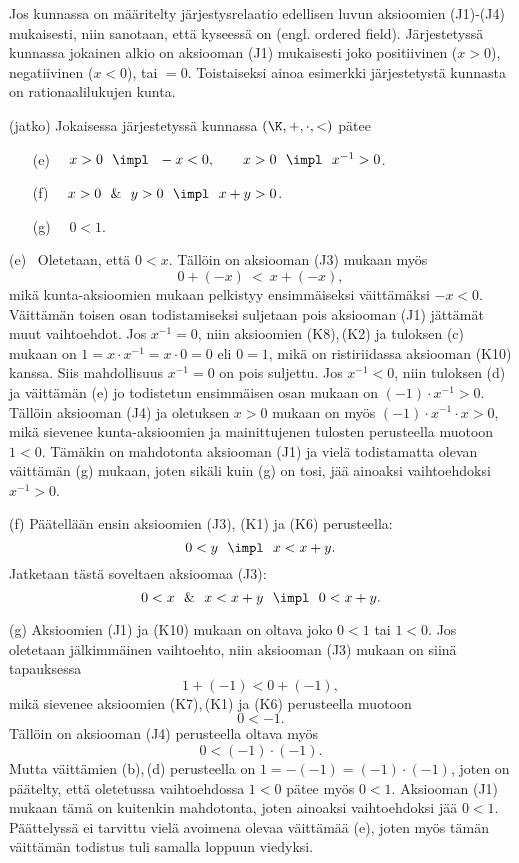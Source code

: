 Jos kunnassa on määritelty järjestysrelaatio edellisen luvun aksioomien (J1)-(J4) mukaisesti,
niin sanotaan, että kyseessä on  (engl. ordered field). Järjestetyssä
kunnassa jokainen alkio on aksiooman (J1) mukaisesti joko positiivinen ($x>0$), negatiivinen
($x<0$), tai $=0$. Toistaiseksi ainoa esimerkki järjestetystä kunnasta on rationaalilukujen
kunta. 
\addtocounter{Thm}{-2}
\begin{Lause} (jatko) Jokaisessa järjestetyssä kunnassa $(\K,+,\cdot,<)$ pätee
\begin{itemize}
\item[(e)] $\quad x>0\ \ \impl\ \ -x<0, \quad\quad x>0\ \ \impl\ \ x^{-1} > 0$.
\item[(f)] $\quad x>0\ \ \&\ \ y>0 \ \ \impl\ \ x+y>0$.
\item[(g)] $\quad 0 < 1$.
\end{itemize} \end{Lause}
\addtocounter{Thm}{1}
\tod (e) \ Oletetaan, että $0<x$. Tällöin on aksiooman (J3) mukaan myös 
\[
0+(-x)\ <\ x + (-x), 
\]
mikä kunta-aksioomien mukaan pelkistyy ensimmäiseksi väittämäksi $-x < 0$. Väittämän toisen 
osan todistamiseksi suljetaan pois aksiooman (J1) jättämät muut vaihtoehdot. Jos $x^{-1} = 0$,
niin aksioomien (K8),\,(K2) ja tuloksen (c) mukaan on $1 = x \cdot x^{-1} = x \cdot 0 = 0$ eli
$0=1$, mikä on ristiriidassa aksiooman (K10) kanssa. Siis mahdollisuus $x^{-1} = 0$ on pois
suljettu. Jos $x^{-1} < 0$, niin tuloksen (d) ja väittämän (e) jo todistetun ensimmäisen osan
mukaan on $(-1) \cdot x^{-1} > 0$. Tällöin aksiooman (J4) ja oletuksen $x>0$ mukaan on myös 
$(-1) \cdot x^{-1} \cdot x > 0$, mikä sievenee kunta-aksioomien ja mainittujenen tulosten 
perusteella muotoon $1<0$. Tämäkin on mahdotonta aksiooman (J1) ja vielä todistamatta olevan 
väittämän (g) mukaan, joten sikäli kuin (g) on tosi, jää ainoaksi vaihtoehdoksi $x^{-1} > 0$.   

(f) Päätellään ensin aksioomien (J3), (K1) ja (K6) perusteella:
\[
0<y\ \ \impl\ \ x<x+y.
\]
Jatketaan tästä soveltaen aksioomaa (J3):
\[
0<x\ \ \&\ \ x<x+y\ \ \impl\ \ 0<x+y.
\]

(g) Aksioomien (J1) ja (K10) mukaan on oltava joko $0<1$ tai $1<0$. Jos oletetaan jälkimmäinen
vaihtoehto, niin aksiooman (J3) mukaan on siinä tapauksessa
\[
1 + (-1) < 0 + (-1),
\]
mikä sievenee aksioomien (K7),\,(K1) ja (K6) perusteella muotoon
\[
0 < -1.
\]
Tällöin on aksiooman (J4) perusteella oltava myös
\[
0 < (-1) \cdot (-1).
\]
Mutta väittämien (b),\,(d) perusteella on $1 = -(-1) = (-1) \cdot (-1)$, joten on päätelty,
että oletetussa vaihtoehdossa $1<0$ pätee myös $0<1$. Aksiooman (J1) mukaan tämä on kuitenkin 
mahdotonta, joten ainoaksi vaihtoehdoksi jää $0<1$. Päättelyssä ei tarvittu vielä avoimena 
olevaa väittämää (e), joten myös tämän väittämän todistus tuli samalla loppuun viedyksi. 
\loppu

